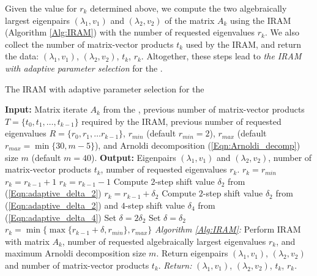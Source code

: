 Given the value for $r_k$ determined above, we compute the two algebraically largest eigenpairs $(\lambda_1, v_1)$ and $(\lambda_2, v_2)$ of the matrix $A_k$ using the IRAM (Algorithm \ref{Alg:IRAM}) with the number of requested eigenvalues $r_k$.
We also collect the number of matrix-vector products $t_k$ used by the IRAM, and return the data: $(\lambda_1, v_1)$, $(\lambda_2, v_2)$, $t_k$, $r_k$.
Altogether, these steps lead to \textit{the IRAM with adaptive parameter selection} for the \emep.


\begin{algorithm}[H]
\caption{The IRAM with adaptive parameter selection for the \emep}	\label{Alg:adaptive_IRAM}

\begin{algorithmic}[1]
	\Statex 	\textbf{Input:} 	Matrix iterate $A_k$ from the \emep,
	previous number of matrix-vector products $T =  \{ t_0, t_1, \ldots , t_{k-1}\}$ required by the IRAM, 
	previous number of requested eigenvalues $R =  \{ r_0, r_1, \ldots r_{k-1}\}$,
	$r_{min}$ (default $r_{min} = 2$), $r_{max}$ (default $r_{max} = \min \{ 30, m-5\}$),
	 and Arnoldi decomposition (\ref{Eqn:Arnoldi_decomp})  size $m$ (default $m = 40$).
	\Statex 	\textbf{Output:} Eigenpairs $ (\lambda_1, v_1)$ and  $ (\lambda_2, v_2)$, number of matrix-vector products $t_{k}$, number of requested eigenvalues $r_{k}$.
			\State		$r_k = r_{min}$
			\State 		$r_k = r_{k-1} + 1$
			\State		$r_k = r_{k-1} - 1$
			\State		Compute $2$-step shift value $\delta_2$ from (\ref{Eqn:adaptive_delta_2})
			\State		$r_k = r_{k-1} + \delta_2$
		\Else
			\State 		Compute $2$-step shift value $\delta_2$ from (\ref{Eqn:adaptive_delta_2}) and $4$-step shift value $\delta_4$ from (\ref{Eqn:adaptive_delta_4})
				\State		Set $\delta = 2\delta_2$
			\Else
				\State 			Set $\delta = \delta_2$
			\EndIf
			\State		$r_k =\min \{ \max \{ r_{k-1} + \delta, r_{min} \}, r_{max} \}$
		\EndIf
		\State		\textit{Algorithm \ref{Alg:IRAM}:} Perform IRAM with matrix $A_k$, number of requested algebraically largest eigenvalues $r_k$, and maximum Arnoldi decomposition size $m$.  Return eigenpairs $(\lambda_1, v_1 )$, $(\lambda_2, v_2 )$ and number of matrix-vector products $t_k$.
	\State		\textit{Return:} $(\lambda_1, v_1)$, $(\lambda_2, v_2)$, $t_k$, $r_k$.
\end{algorithmic}

\end{algorithm}



